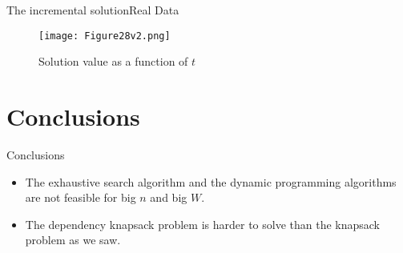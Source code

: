 \documentclass{beamer}
\begin{document}
\begin{frame}{The incremental solution}{Real Data}
    \begin{figure}
        \centering
        \texttt{[image: Figure28v2.png]}
        \caption{Solution value as a function of $t$}
    \end{figure}
\end{frame}
\begin{comment}
\begin{frame}{The incremental solution}{Real Data - Experiment IV}
    \begin{itemize}
        \item {We saw that on real data the incremental solution makes a 
        difference.}
        \item {We get the same solution and save some time.}
    \end{itemize}
    \begin{block}{Experiment IV}
    Just to make sure we ran the same experiment on the data that was 
    collected on 03/09/2017. 
    \end{block}
\end{frame}

\begin{frame}{The incremental solution}{Real Data - Experiment IV}
    \begin{figure}
        \centering
        \texttt{[image: Figure29v2.png]}
        \caption{Runtime in seconds as a function of $t$}
    \end{figure}
\end{frame}

\begin{frame}{The incremental solution}{Real Data - Experiment IV}
    \begin{figure}
        \centering
        \texttt{[image: Figure30v2.png]}
        \caption{Solution value as a function of $t$}
    \end{figure}
\end{frame}
\end{comment}
\section {Conclusions}
\begin{frame}{Conclusions} %
    \begin{itemize}
        \item {The exhaustive search algorithm and the dynamic programming algorithms are not feasible for big $n$ and big $W$.}
        \item {The dependency knapsack problem is harder to solve than the knapsack problem as we saw.}
    \end{itemize}
\end{frame}
\end{document}
